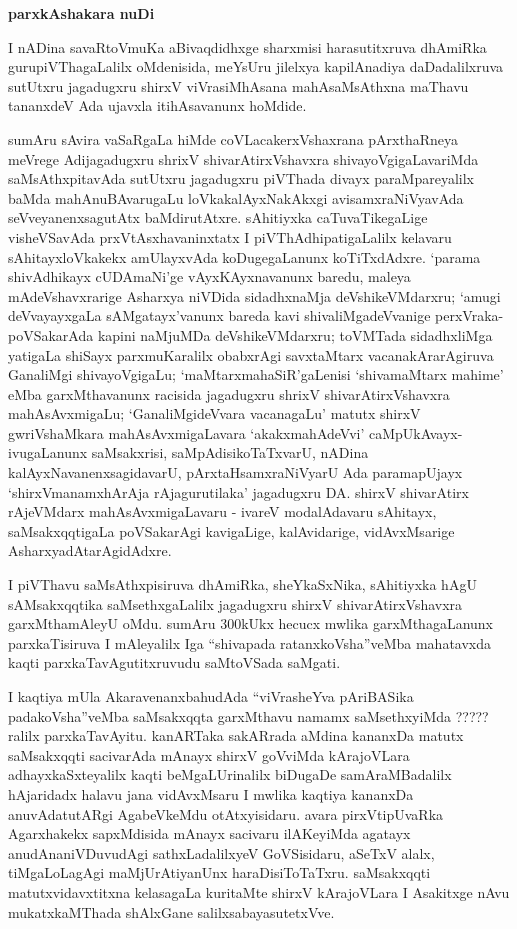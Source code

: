 \begin{center}
{\Huge\bfseries parxkAshakara nuDi}
\end{center}

\bigskip

I nADina savaRtoVmuKa aBivaqdidhxge sharxmisi harasutitxruva dhAmiRka gurupiVThagaLalilx oMdenisida, meYsUru jilelxya kapilA\-nadiya daDadalilxruva sutUtxru jagadugxru shirxV viVrasiMhAsana mahAsaMsAthxna maThavu tananxdeV Ada ujavxla itihAsavanunx hoMdide.

\smallskip

sumAru sAvira vaSaRgaLa hiMde coVLacakerxVshaxrana pArxthaRneya meVrege Adijagadugxru shrixV shivarAtirxVshavxra shivayoVgigaLavariMda saMsAthxpitavAda sutUtxru jagadugxru piVThada divayx paraMpareyalilx baMda mahAnuBAvarugaLu loVkakalAyxNakAkxgi avisamxraNiVyavAda seVveyanenxsagutAtx baMdirutAtxre. sAhitiyxka caTuvaTikegaLige visheVSavAda prxVtAsxhavaninxtatx I piVThAdhipatigaLalilx kelavaru sAhitayxloVkakekx amUlayxvAda koDugegaLanunx koTiTxdAdxre. `parama shivAdhikayx cUDAmaNi'ge vAyxKAyxnavanunx baredu, maleya mAdeVshavxrarige Asharxya niVDida sidadhxnaMja deVshikeVMdarxru; `amugi deVvayayxgaLa sAMgatayx'vanunx bareda kavi shivaliMga\-deVvanige perxVraka-poVSakarAda kapini naMjuMDa deVshikeVMdarxru; toVMTada sidadhxliMga yatigaLa shiSayx parxmuKaralilx obabxrAgi savxtaMtarx vacanakArarAgiruva GanaliMgi shivayoVgigaLu; `maMtarxmahaSiR'gaLenisi `shivamaMtarx mahime' eMba garxMthavanunx racisida jagadugxru shrixV shivarAtirxVshavxra mahAsAvxmigaLu; `GanaliMgideVvara vacanagaLu' matutx shirxV gwriVshaMkara mahAsAvxmigaLavara `akakxmahAdeVvi' caMpUkAvayx-ivugaLanunx saMsakxrisi, saMpAdisikoTaTxvarU, nADina kalAyxNavanenxsagidavarU, pArxtaHsamxraNiVyarU Ada paramapUjayx `shirxVmanamxhArAja rAjagurutilaka' jagadugxru DA. shirxV shivarAtirx rAjeVMdarx mahAsAvxmigaLavaru - ivareV modalAdavaru sAhitayx, saMsakxqqtigaLa poVSakarAgi kavigaLige, kalAvidarige, vidAvxMsarige AsharxyadAtarAgidAdxre.

\smallskip

I piVThavu saMsAthxpisiruva dhAmiRka, sheYkaSxNika, sAhitiyxka hAgU sAMsakxqqtika saMsethxgaLalilx jagadugxru shirxV shivarAtirxVshavxra garxMtha\-mAleyU oMdu. sumAru 300kUkx hecucx mwlika garxMthagaLanunx parxkaTisiruva I mAleyalilx Iga ``shivapada ratanxkoVsha''veMba mahatavxda kaqti parxkaTavAgutitxruvudu saMtoVSada saMgati.

\smallskip

I kaqtiya mUla AkaravenanxbahudAda ``viVrasheYva pAriBASika padakoVsha''veMba saMsakxqqta garxMthavu namamx saMsethxyiMda ????? ralilx parxkaTavAyitu. kanARTaka sakARrada aMdina kananxDa matutx saMsakxqqti sacivarAda mAnayx shirxV goVviMda kArajoVLara adhayxkaSxte\-yalilx kaqti beMgaLUrinalilx biDugaDe samAraMBadalilx hAjaridadx halavu jana vidAvxMsaru I mwlika kaqtiya kananxDa anuvAda\break tutARgi AgabeVkeMdu otAtxyisidaru. avara pirxVtipUvaRka Agarxhakekx sapxMdisida mAnayx sacivaru ilAKeyiMda agatayx anudAna\break niVDuvudAgi sathxLadalilxyeV GoVSisidaru, aSeTxV alalx, tiMgaLoLagAgi maMjUrAtiyanUnx haraDisiToTaTxru. saMsakxqqti matutx\break vidavxtitxna kelasagaLa kuritaMte shirxV kArajoVLara I Asakitxge nAvu mukatxkaMThada shAlxGane salilxsabayasutetxVve.

